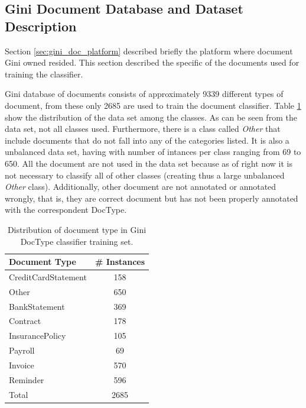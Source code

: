 \subsection{Gini Document Database and Dataset Description}
\label{sec:gini_db_dataset_desc}
  
Section \ref{sec:gini_doc_platform} described briefly the platform where
document Gini owned resided. This section described the specific of the
documents used for training the classifier. 

Gini database of documents consists of approximately 9339 different types of
document, from these only 2685 are used to train the document classifier.
Table \ref{tab:doctype_classifier_classes} show the distribution of the data
set among the classes. As can be seen from the data set, not all classes
used. Furthermore, there is a class called \textit{Other} that include
documents that do not fall into any of the categories listed. It is also a
unbalanced data set, having with number of intances per class ranging from 69
to 650. All the document are not used in the data set because as of right now
it is not necessary to classify all of other classes (creating thus a large
unbalanced \textit{Other} class). Additionally, other document are not
annotated or annotated wrongly, that is, they are correct document but has
not been properly annotated with the correspondent \ac{DocType}.


\begin{table}[h]

  \centering
  \caption{Distribution of document type in  Gini \ac{DocType} classifier training set.}
  \label{tab:doctype_classifier_classes}

\small
\begin{tabular}{|l|c|}
\hline
 \textbf{Document Type}    &  \textbf{\# Instances}  \\
\hline
 CreditCardStatement  &           158  \\
 Other                &           650  \\
 BankStatement        &           369  \\
 Contract             &           178  \\
 InsurancePolicy      &           105  \\
 Payroll              &            69  \\
 Invoice              &           570  \\
 Reminder             &           596  \\
\hline
 Total                &          2685  \\
\hline
\end{tabular}
\end{table}

